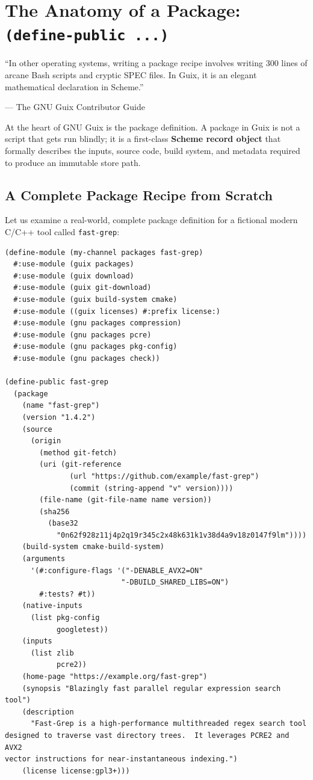 \chapter{The Anatomy of a Package: \texttt{(define-public ...)}}
\label{chap:anatomy-of-package}

\epigraph{``In other operating systems, writing a package recipe involves writing 300 lines of arcane Bash scripts and cryptic SPEC files. In Guix, it is an elegant mathematical declaration in Scheme.''}{--- The GNU Guix Contributor Guide}

\noindent
At the heart of GNU Guix is the package definition. A package in Guix is not a script that gets run blindly; it is a first-class \textbf{Scheme record object} that formally describes the inputs, source code, build system, and metadata required to produce an immutable store path.

\section{A Complete Package Recipe from Scratch}

Let us examine a real-world, complete package definition for a fictional modern C/C++ tool called \texttt{fast-grep}:

\begin{lstlisting}[style=guixscheme]
(define-module (my-channel packages fast-grep)
  #:use-module (guix packages)
  #:use-module (guix download)
  #:use-module (guix git-download)
  #:use-module (guix build-system cmake)
  #:use-module ((guix licenses) #:prefix license:)
  #:use-module (gnu packages compression)
  #:use-module (gnu packages pcre)
  #:use-module (gnu packages pkg-config)
  #:use-module (gnu packages check))

(define-public fast-grep
  (package
    (name "fast-grep")
    (version "1.4.2")
    (source
      (origin
        (method git-fetch)
        (uri (git-reference
               (url "https://github.com/example/fast-grep")
               (commit (string-append "v" version))))
        (file-name (git-file-name name version))
        (sha256
          (base32
            "0n62f928z11j4p2q19r345c2x48k631k1v38d4a9v18z0147f9lm"))))
    (build-system cmake-build-system)
    (arguments
      '(#:configure-flags '("-DENABLE_AVX2=ON"
                           "-DBUILD_SHARED_LIBS=ON")
        #:tests? #t))
    (native-inputs
      (list pkg-config
            googletest))
    (inputs
      (list zlib
            pcre2))
    (home-page "https://example.org/fast-grep")
    (synopsis "Blazingly fast parallel regular expression search tool")
    (description
      "Fast-Grep is a high-performance multithreaded regex search tool
designed to traverse vast directory trees.  It leverages PCRE2 and AVX2
vector instructions for near-instantaneous indexing.")
    (license license:gpl3+)))
\end{lstlisting}

